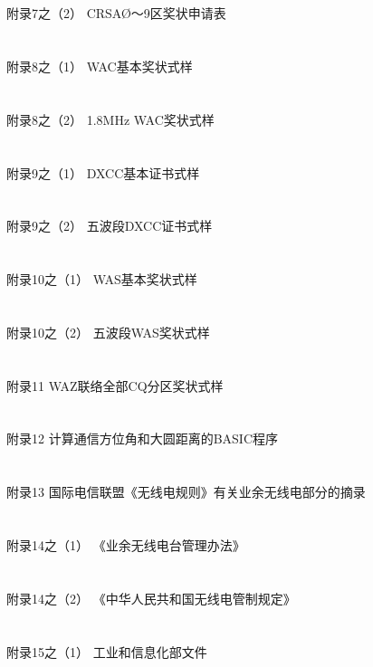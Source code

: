 \documentclass[12pt,UTF8]{ctexbook}
\begin{document}
\section{}附录7之（2） CRSAØ～9区奖状申请表
\section{}附录8之（1） WAC基本奖状式样
\section{}附录8之（2） 1.8MHz WAC奖状式样
\section{}附录9之（1） DXCC基本证书式样
\section{}附录9之（2） 五波段DXCC证书式样
\section{}附录10之（1） WAS基本奖状式样
\section{}附录10之（2） 五波段WAS奖状式样
\section{}附录11 WAZ联络全部CQ分区奖状式样
\section{}附录12 计算通信方位角和大圆距离的BASIC程序
\section{}附录13 国际电信联盟《无线电规则》有关业余无线电部分的摘录
\section{}附录14之（1） 《业余无线电台管理办法》
\section{}附录14之（2） 《中华人民共和国无线电管制规定》
\section{}附录15之（1） 工业和信息化部文件
\end{document}
